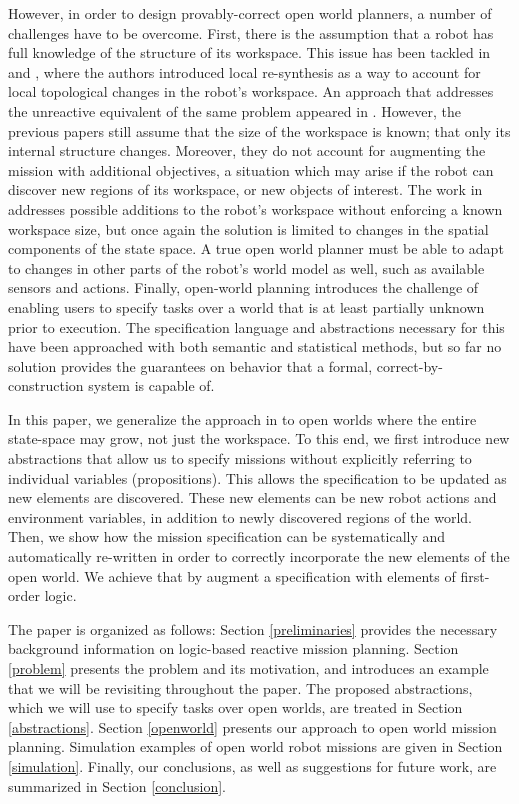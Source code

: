 However, in order to design provably-correct open world planners, a number of challenges have to be overcome. 
First, there is the assumption that a robot has full knowledge of the structure of its workspace. This issue has been tackled in \cite{MurrayICRA2012} and \cite{MurrayICRA2013a}, where the authors introduced local re-synthesis as a way to account for local topological changes in the robot's workspace. 
An approach that addresses the unreactive equivalent of the same problem appeared in \cite{Dimos2013ICRA}. 
However, the previous papers still assume that the size of the workspace is known; that only its internal structure changes. Moreover, they do not account for augmenting the mission with additional objectives, a situation which may arise if the robot can discover new regions of its workspace, or new objects of interest. 
The work in \cite{BingxinRSS2012} addresses possible additions to the robot's workspace without enforcing a known workspace size, but once again the solution is limited to changes in the spatial components of the state space. 
A true open world planner must be able to adapt to changes in other parts of the robot's world model as well, such as available sensors and actions. 
Finally, open-world planning introduces the challenge of enabling users to specify tasks over a world that is at least partially unknown prior to execution. The specification language and abstractions necessary for this have been approached with both semantic \cite{Joshi2012, MatthiasAI2010} and statistical \cite{Tellex2011} methods, but so far no solution provides the guarantees on behavior that a formal, correct-by-construction system is capable of. 

In this paper, we generalize the approach in \cite{BingxinRSS2012} to open worlds where the entire state-space may grow, not just the workspace. 
To this end, we first introduce new abstractions that allow us to specify missions without explicitly referring to individual variables (propositions). This allows the specification to be updated as new elements are discovered. These new elements can be new robot actions and environment variables, in addition to newly discovered regions of the world. 
Then, we show how the mission specification can be systematically and automatically re-written in order to correctly incorporate the new elements of the open world. We achieve that by augment a specification with elements of first-order logic.

The paper is organized as follows: Section \ref{preliminaries} provides the necessary background information on logic-based reactive mission planning. Section \ref{problem} presents the problem and its motivation, and introduces an example that we will be revisiting throughout the paper. The proposed abstractions, which we will use to specify tasks over open worlds, are treated in Section \ref{abstractions}. Section \ref{openworld} presents our approach to open world mission planning. Simulation examples of open world robot missions are given in Section \ref{simulation}. Finally, our conclusions, as well as suggestions for future work, are summarized in Section \ref{conclusion}.

